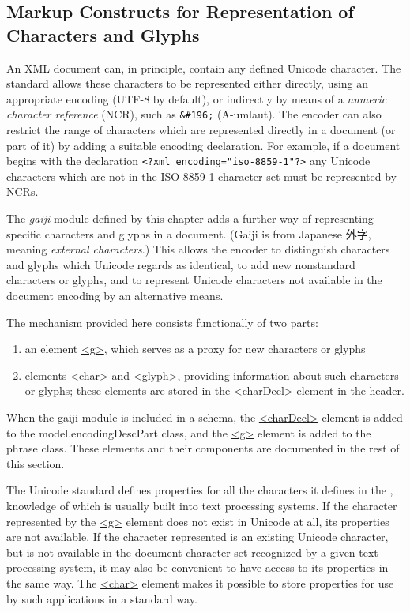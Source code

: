 \subsection[{Markup Constructs for Representation of Characters and Glyphs}]{Markup Constructs for Representation of Characters and Glyphs}\label{D25-20}\par
An XML document can, in principle, contain any defined Unicode character. The standard allows these characters to be represented either directly, using an appropriate encoding (UTF-8 by default), or indirectly by means of a \textit{numeric character reference} (NCR), such as \texttt{\&\#196;} (A-umlaut). The encoder can also restrict the range of characters which are represented directly in a document (or part of it) by adding a suitable encoding declaration. For example, if a document begins with the declaration \texttt{<?xml encoding="iso-8859-1"?>} any Unicode characters which are not in the ISO-8859-1 character set must be represented by NCRs.\par
The \textit{gaiji} module defined by this chapter adds a further way of representing specific characters and glyphs in a document. (Gaiji is from Japanese {\textJapanese 外字}, meaning  \textit{external characters}.) This allows the encoder to distinguish characters and glyphs which Unicode regards as identical, to add new nonstandard characters or glyphs, and to represent Unicode characters not available in the document encoding by an alternative means.\par
The mechanism provided here consists functionally of two parts: \begin{enumerate}
\item an element \hyperref[TEI.g]{<g>}, which serves as a proxy for new characters or glyphs
\item elements \hyperref[TEI.char]{<char>} and \hyperref[TEI.glyph]{<glyph>}, providing information about such characters or glyphs; these elements are stored in the \hyperref[TEI.charDecl]{<charDecl>} element in the header.
\end{enumerate}\par
When the gaiji module is included in a schema, the \hyperref[TEI.charDecl]{<charDecl>} element is added to the \textsf{model.encodingDescPart} class, and the \hyperref[TEI.g]{<g>} element is added to the phrase class. These elements and their components are documented in the rest of this section.\par
The Unicode standard defines properties for all the characters it defines in the , knowledge of which is usually built into text processing systems. If the character represented by the \hyperref[TEI.g]{<g>} element does not exist in Unicode at all, its properties are not available. If the character represented is an existing Unicode character, but is not available in the document character set recognized by a given text processing system, it may also be convenient to have access to its properties in the same way. The \hyperref[TEI.char]{<char>} element makes it possible to store properties for use by such applications in a standard way.\par
